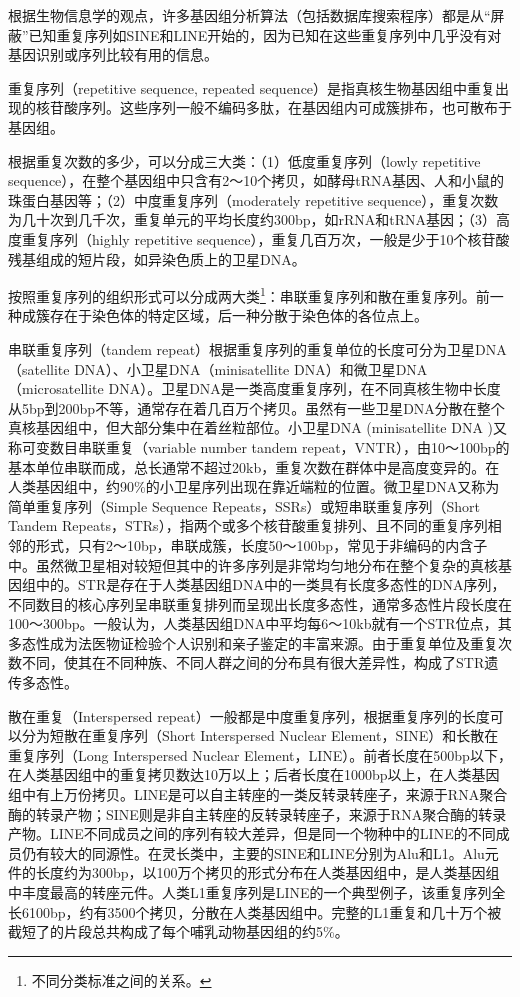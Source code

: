\documentclass[11pt,a4paper,twoside]{book}
\begin{document}
根据生物信息学的观点，许多基因组分析算法（包括数据库搜索程序）都是从“屏蔽”已知重复序列如SINE和LINE开始的，因为已知在这些重复序列中几乎没有对基因识别或序列比较有用的信息。

重复序列（repetitive sequence, repeated sequence）是指真核生物基因组中重复出现的核苷酸序列。这些序列一般不编码多肽，在基因组内可成簇排布，也可散布于基因组。

根据重复次数的多少，可以分成三大类：（1）低度重复序列（lowly repetitive sequence），在整个基因组中只含有2～10个拷贝，如酵母tRNA基因、人和小鼠的珠蛋白基因等；（2）中度重复序列（moderately repetitive sequence），重复次数为几十次到几千次，重复单元的平均长度约300bp，如rRNA和tRNA基因；（3）高度重复序列（highly repetitive sequence），重复几百万次，一般是少于10个核苷酸残基组成的短片段，如异染色质上的卫星DNA。

按照重复序列的组织形式可以分成两大类\footnote{不同分类标准之间的关系。}：串联重复序列和散在重复序列。前一种成簇存在于染色体的特定区域，后一种分散于染色体的各位点上。

串联重复序列（tandem repeat）根据重复序列的重复单位的长度可分为卫星DNA（satellite DNA）、小卫星DNA（minisatellite DNA）和微卫星DNA（microsatellite DNA）。卫星DNA是一类高度重复序列，在不同真核生物中长度从5bp到200bp不等，通常存在着几百万个拷贝。虽然有一些卫星DNA分散在整个真核基因组中，但大部分集中在着丝粒部位。小卫星DNA (minisatellite DNA )又称可变数目串联重复（variable number tandem repeat，VNTR），由10～100bp的基本单位串联而成，总长通常不超过20kb，重复次数在群体中是高度变异的。在人类基因组中，约90\%的小卫星序列出现在靠近端粒的位置。微卫星DNA又称为简单重复序列（Simple Sequence Repeats，SSRs）或短串联重复序列（Short Tandem Repeats，STRs），指两个或多个核苷酸重复排列、且不同的重复序列相邻的形式，只有2～10bp，串联成簇，长度50～100bp，常见于非编码的内含子中。虽然微卫星相对较短但其中的许多序列是非常均匀地分布在整个复杂的真核基因组中的。STR是存在于人类基因组DNA中的一类具有长度多态性的DNA序列，不同数目的核心序列呈串联重复排列而呈现出长度多态性，通常多态性片段长度在100～300bp。一般认为，人类基因组DNA中平均每6～10kb就有一个STR位点，其多态性成为法医物证检验个人识别和亲子鉴定的丰富来源。由于重复单位及重复次数不同，使其在不同种族、不同人群之间的分布具有很大差异性，构成了STR遗传多态性。

散在重复（Interspersed repeat）一般都是中度重复序列，根据重复序列的长度可以分为短散在重复序列（Short Interspersed Nuclear Element，SINE）和长散在重复序列（Long Interspersed Nuclear Element，LINE）。前者长度在500bp以下，在人类基因组中的重复拷贝数达10万以上；后者长度在1000bp以上，在人类基因组中有上万份拷贝。LINE是可以自主转座的一类反转录转座子，来源于RNA聚合酶的转录产物；SINE则是非自主转座的反转录转座子，来源于RNA聚合酶的转录产物。LINE不同成员之间的序列有较大差异，但是同一个物种中的LINE的不同成员仍有较大的同源性。在灵长类中，主要的SINE和LINE分别为Alu和L1。Alu元件的长度约为300bp，以100万个拷贝的形式分布在人类基因组中，是人类基因组中丰度最高的转座元件。人类L1重复序列是LINE的一个典型例子，该重复序列全长6100bp，约有3500个拷贝，分散在人类基因组中。完整的L1重复和几十万个被截短了的片段总共构成了每个哺乳动物基因组的约5\%。
\end{document}
